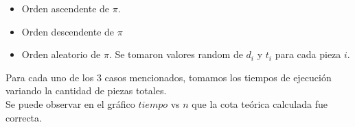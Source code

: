 \documentclass[11pt, a4paper, twoside]{article}
\begin{document}
\begin{itemize}
\item Orden ascendente de $\pi$. 
\item Orden descendente de $\pi$ 
\item Orden aleatorio de $\pi$. Se tomaron valores random de $d_i$ y $t_i$ para cada pieza $i$. 
\end{itemize}     

Para cada uno de los $3$ casos mencionados, tomamos los tiempos de ejecución variando la cantidad de piezas totales.\\
Se puede observar en el gráfico $tiempo$ vs $n$ que la cota teórica calculada  fue correcta.  
 

\end{document}
